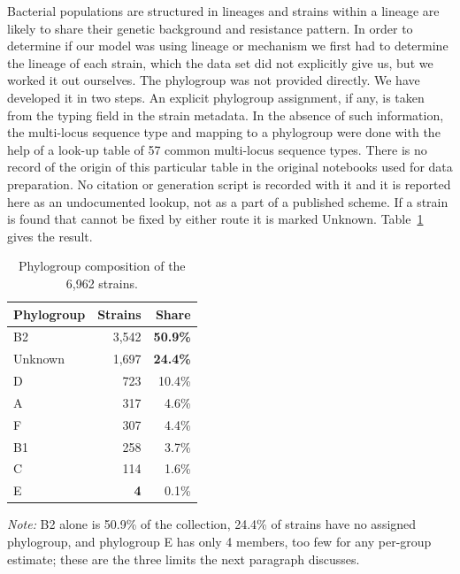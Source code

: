 Bacterial populations are structured in lineages and strains within a lineage are likely to
share their genetic background and resistance pattern. In order to determine if our model was
using lineage or mechanism we first had to determine the lineage of each strain, which the
data set did not explicitly give us, but we worked it out ourselves. The phylogroup was not provided directly. We have developed it in two steps. An
explicit phylogroup assignment, if any, is taken from the typing field in the strain metadata.
In the absence of such information, the multi-locus sequence type and mapping to a phylogroup
were done with the help of a look-up table of 57 common multi-locus sequence types. There is no
record of the origin of this particular table in the original notebooks used for data
preparation. No citation or generation script is recorded with it and it is reported here as an
undocumented lookup, not as a part of a published scheme. If a strain is found that cannot be
fixed by either route it is marked Unknown.
Table~\ref{tab:phylogroups} gives the result.

\begin{table}[htb]
\centering
\caption{Phylogroup composition of the 6,962 strains.}
\label{tab:phylogroups}
\small
\begin{tabular}{|l|r|r|}
\hline
\textbf{Phylogroup} & \textbf{Strains} & \textbf{Share} \\
\hline
B2      & 3,542 & \textbf{50.9\%} \\ \hline
Unknown & 1,697 & \textbf{24.4\%} \\ \hline
D       &   723 & 10.4\% \\ \hline
A       &   317 &  4.6\% \\ \hline
F       &   307 &  4.4\% \\ \hline
B1      &   258 &  3.7\% \\ \hline
C       &   114 &  1.6\% \\ \hline
E       & \textbf{4} &  0.1\% \\ \hline
\end{tabular}
\vspace{0.4em}

\noindent\footnotesize\textit{Note:} B2 alone is 50.9\% of the collection, 24.4\% of strains
have no assigned phylogroup, and phylogroup E has only 4 members, too few for any per-group
estimate; these are the three limits the next paragraph discusses.
\end{table}

